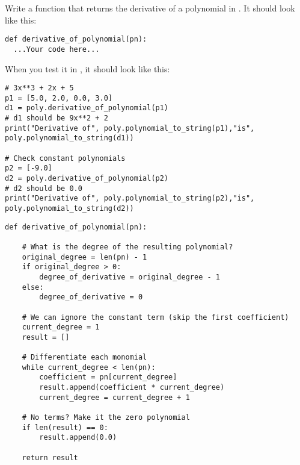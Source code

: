 \begin{Exercise}[title={Differentiation of polynomials in Python}, label=pydiffpoly]
  Write a function that returns the derivative of a polynomial in . It should look like this:
\begin{Verbatim}
def derivative_of_polynomial(pn):
  ...Your code here...
\end{Verbatim}
When you test it in , it should look like this:
\begin{Verbatim}
# 3x**3 + 2x + 5
p1 = [5.0, 2.0, 0.0, 3.0]
d1 = poly.derivative_of_polynomial(p1)
# d1 should be 9x**2 + 2
print("Derivative of", poly.polynomial_to_string(p1),"is", poly.polynomial_to_string(d1))

# Check constant polynomials
p2 = [-9.0]
d2 = poly.derivative_of_polynomial(p2)
# d2 should be 0.0
print("Derivative of", poly.polynomial_to_string(p2),"is", poly.polynomial_to_string(d2))
\end{Verbatim}
\end{Exercise}
\begin{Answer}[ref=pydiffpoly]
\begin{Verbatim}
def derivative_of_polynomial(pn):

    # What is the degree of the resulting polynomial?
    original_degree = len(pn) - 1
    if original_degree > 0:
        degree_of_derivative = original_degree - 1
    else:
        degree_of_derivative = 0

    # We can ignore the constant term (skip the first coefficient)
    current_degree = 1
    result = []

    # Differentiate each monomial
    while current_degree < len(pn):
        coefficient = pn[current_degree]
        result.append(coefficient * current_degree)
        current_degree = current_degree + 1

    # No terms? Make it the zero polynomial
    if len(result) == 0:
        result.append(0.0)

    return result
\end{Verbatim}
\end{Answer}

